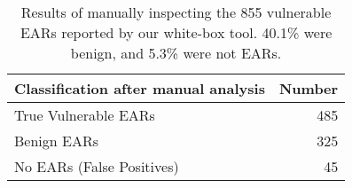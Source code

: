 \begin{table}[tb]
  \centering
  \begin{tabular}{lr}
    Classification after manual analysis & Number \\
    \hline
    True Vulnerable EARs  & 485 \\
    Benign EARs  & 325 \\
    No EARs (False Positives)  & 45 \\
    \hline
  \end{tabular}
  \caption{Results of manually inspecting the 855 vulnerable EARs
    reported by our white-box tool. 40.1\% were benign, and 5.3\% were
    not EARs.}
\end{table}
